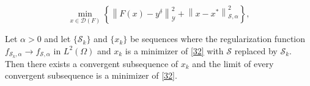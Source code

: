 \documentclass[10pt,a4paper]{amsart}
\begin{document}
\begin{equation}\label{32}
\min_{x\in \mathcal{D}(F)}\left\{\left\|F(x) - y^\delta\right\|^2_\mathcal{Y} + \left\|x - x^*\right\|_{\mathcal{S}, \alpha}^2\right\},
\end{equation}

\begin{theorem}\label{thm52}
Let $ \alpha>0 $ and let $ \{\mathcal{S}_k\} $ and $ \{x_k\} $ be sequences where the regularization function $ f_{\mathcal{S}_k,\alpha}\to f_{\mathcal{S},\alpha} $ in $ L^2(\Omega) $ and $ x_k $ is a minimizer of \eqref{32} with $ \mathcal{S} $ replaced by $ \mathcal{S}_k $. 
Then there exists a convergent subsequence of $ x_k $ and the limit of every convergent subsequence is a minimizer of \eqref{32}.
\end{theorem}
\end{document}
